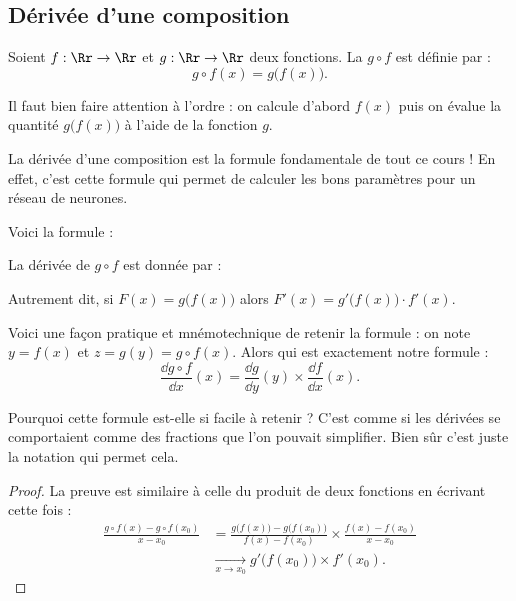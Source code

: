 \documentclass[11pt,class=report,crop=false]{standalone}
\begin{document}
\subsection{Dérivée d'une composition}


Soient $f : \Rr \to \Rr$ et $g :  \Rr \to \Rr$ deux fonctions. La  $g\circ f$ est définie par :
$$g\circ f(x) = g\big( f(x) \big).$$

Il faut bien faire attention à l'ordre : on calcule d'abord $f(x)$ puis on évalue la quantité $g\big( f(x) \big)$ à l'aide de la fonction $g$.


La dérivée d'une composition est la formule fondamentale de tout ce cours !
En effet, c'est cette formule qui permet de calculer les bons paramètres pour un réseau de neurones.

Voici la formule :
\begin{proposition}
La dérivée de $g \circ f$ est donnée par :
\end{proposition}


Autrement dit, si $F(x) = g\big( f(x) \big)$ alors $F'(x) = g'\big( f(x) \big) \cdot f'(x)$.

Voici une façon pratique et mnémotechnique de retenir la formule :
on note $y = f(x)$ et $z = g(y) = g \circ f(x)$.
Alors
qui est exactement notre formule :
$$\frac{\dd g\circ f}{\dd x}(x)  = \frac{\dd g}{\dd y}(y) \times \frac{\dd f}{\dd x}(x).$$

Pourquoi cette formule est-elle si facile à retenir ? C'est comme si les dérivées se comportaient comme des fractions que l'on pouvait simplifier.
Bien sûr c'est juste la notation qui permet cela.



\begin{proof}
La preuve est similaire à celle du produit de deux fonctions en écrivant cette fois :
\begin{align*}
\frac{g\circ f(x)-g\circ f(x_0)}{x-x_0} 
&= \frac{g\big( f(x)\big)-g\big( f(x_0)\big)}{f(x)-f(x_0)} \times \frac{f(x)-f(x_0)}{x-x_0} \\
&\xrightarrow[x\to x_0]{} g'\big(f(x_0)\big) \times f'(x_0).
\end{align*}
\end{proof}
\end{document}
